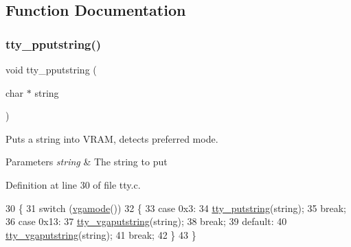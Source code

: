 \subsection{Function Documentation}
\mbox{\label{a00113_ade960b1320324706aac6c00cc6b1b2fe_ade960b1320324706aac6c00cc6b1b2fe}} 
\subsubsection{\texorpdfstring{tty\+\_\+pputstring()}{tty\_pputstring()}}
{\footnotesize\ttfamily void tty\+\_\+pputstring (\begin{DoxyParamCaption}\item[{char $\ast$}]{string }\end{DoxyParamCaption})}



Puts a string into V\+R\+AM, detects preferred mode. 


\begin{DoxyParams}{Parameters}
{\em string} & The string to put \\
\hline
\end{DoxyParams}


Definition at line 30 of file tty.\+c.


\begin{DoxyCode}
30                                   \{
31     \textcolor{keywordflow}{switch} (\hyperlink{a00026_af6d170c9401ea8f94d4c5cf09347cca7_af6d170c9401ea8f94d4c5cf09347cca7}{vgamode}())
32     \{
33     \textcolor{keywordflow}{case} 0x3:
34         \hyperlink{a00113_a2ebb962f457a2677d70285d1c0f9be12_a2ebb962f457a2677d70285d1c0f9be12}{tty\_putstring}(\textcolor{keywordtype}{string});
35         \textcolor{keywordflow}{break};
36     \textcolor{keywordflow}{case} 0x13:
37         \hyperlink{a00113_a13ff2c06d56753c5666ca56cb2d81100_a13ff2c06d56753c5666ca56cb2d81100}{tty\_vgaputstring}(\textcolor{keywordtype}{string});
38         \textcolor{keywordflow}{break};
39     \textcolor{keywordflow}{default}:
40         \hyperlink{a00113_a13ff2c06d56753c5666ca56cb2d81100_a13ff2c06d56753c5666ca56cb2d81100}{tty\_vgaputstring}(\textcolor{keywordtype}{string});
41         \textcolor{keywordflow}{break};
42     \}
43 \}
\end{DoxyCode}
\mbox{\label{a00113_a2ebb962f457a2677d70285d1c0f9be12_a2ebb962f457a2677d70285d1c0f9be12}} 
